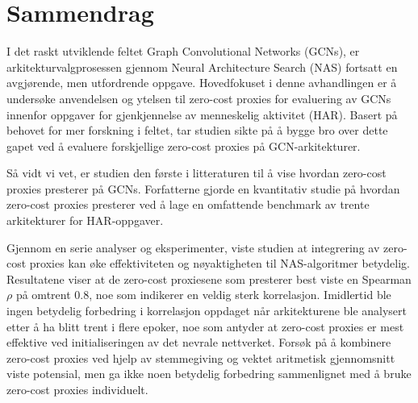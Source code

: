 \chapter*{Sammendrag}

I det raskt utviklende feltet Graph Convolutional Networks (\glspl{GCN}), er arkitekturvalgprosessen gjennom Neural Architecture Search (\gls{NAS}) fortsatt en avgjørende, men utfordrende oppgave. Hovedfokuset i denne avhandlingen er å undersøke anvendelsen og ytelsen til zero-cost proxies for evaluering av \glspl{GCN} innenfor oppgaver for gjenkjennelse av menneskelig aktivitet (\gls{HAR}). Basert på behovet for mer forskning i feltet, tar studien sikte på å bygge bro over dette gapet ved å evaluere forskjellige zero-cost proxies på \gls{GCN}-arkitekturer. 

Så vidt vi vet, er studien den første i litteraturen til å vise hvordan zero-cost proxies presterer på \glspl{GCN}. Forfatterne gjorde en kvantitativ studie på hvordan zero-cost proxies presterer ved å lage en omfattende benchmark av trente arkitekturer for \gls{HAR}-oppgaver. 

Gjennom en serie analyser og eksperimenter, viste studien at integrering av zero-cost proxies kan øke effektiviteten og nøyaktigheten til \gls{NAS}-algoritmer betydelig. Resultatene viser at de zero-cost proxiesene som presterer best viste en Spearman $\rho$ på omtrent $0.8$, noe som indikerer en veldig sterk korrelasjon. Imidlertid ble ingen betydelig forbedring i korrelasjon oppdaget når arkitekturene ble analysert etter å ha blitt trent i flere epoker, noe som antyder at zero-cost proxies er mest effektive ved initialiseringen av det nevrale nettverket. Forsøk på å kombinere zero-cost proxies ved hjelp av stemmegiving og vektet aritmetisk gjennomsnitt viste potensial, men ga ikke noen betydelig forbedring sammenlignet med å bruke zero-cost proxies individuelt. 